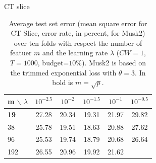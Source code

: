 \documentclass{article}
\begin{document}
\begin{table}[t]
\caption{Average test set error (mean square error for CT Slice, 
error rate, in percent, for Musk2) over ten folds with respect the 
number of featuer $m$ and the learning rate $\lambda$ ($CW=1$, $T=1000$, 
budget=$10\%$). Musk2 is based on the trimmed exponential loss with $\theta=3$. 
In bold is $m=\sqrt{p}$.}
\label{tab:maxFeat}
\begin{center}
\begin{footnotesize}
CT slice
\begin{tabular}{l|ccccc}
\hline
m $\backslash$ $\lambda$  &  $10^{-2.5}$ & $10^{-2}$ & $10^{-1.5}$ & 
$10^{-1}$ & $10^{-0.5}$ \\
\hline
{\bf 19} & \cellcolor[gray]{0.59} 27.28 & \cellcolor[gray]{0.92} 20.34 & 
\cellcolor[gray]{0.97} 19.31 & \cellcolor[gray]{0.84} 21.97 & 
\cellcolor[gray]{0.47} 29.82 \\
38 & \cellcolor[gray]{0.66} 25.78 & \cellcolor[gray]{0.96} 19.51 & 
\cellcolor[gray]{1.00} 18.63 & \cellcolor[gray]{0.89} 20.88 & 
\cellcolor[gray]{0.58} 27.62 \\
96 & \cellcolor[gray]{0.68} 25.53 & \cellcolor[gray]{0.95} 19.74 & 
\cellcolor[gray]{0.99} 18.79 & \cellcolor[gray]{0.90} 20.68 & 
\cellcolor[gray]{0.62} 26.64 \\
192 & \cellcolor[gray]{0.63} 26.55 & \cellcolor[gray]{0.89} 20.96 & 
\cellcolor[gray]{0.94} 19.92 & \cellcolor[gray]{0.86} 21.62 & 

\end{tabular}
\end{footnotesize}
\end{center}
\end{table}
\end{document}
